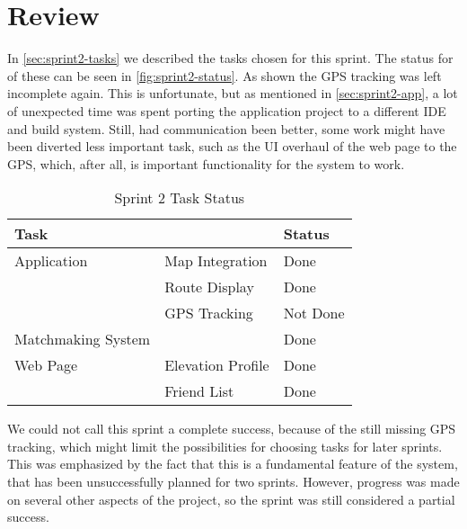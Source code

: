 \section{Review}
\label{sec:sprint2-review}

In \autoref{sec:sprint2-tasks} we described the tasks chosen for this sprint. The status for of these can be seen in \autoref{fig:sprint2-status}. As shown the \ac{GPS} tracking was left incomplete again. This is unfortunate, but as mentioned in \autoref{sec:sprint2-app}, a lot of unexpected time was spent porting the application project to a different \ac{IDE} and build system. Still, had communication been better, some work might have been diverted less important task, such as the \ac{UI} overhaul of the web page to the \ac{GPS}, which, after all, is important functionality for the system to work.

\begin{table}[!ht]
	\centering
	\begin{tabular}{|l l|l|}
		\hline
		\textbf{Task} && \textbf{Status} \\
		\hline
		Application & Map Integration & Done \\
		& Route Display & Done \\
		& \ac{GPS} Tracking & Not Done \\
		\hline
		Matchmaking System && Done \\
		\hline
		Web Page & Elevation Profile & Done \\
		& Friend List & Done \\
		\hline
	\end{tabular}
	\caption{Sprint 2 Task Status}
	\label{fig:sprint2-status}
\end{table}

We could not call this sprint a complete success, because of the still missing \ac{GPS} tracking, which might limit the possibilities for choosing tasks for later sprints. This was emphasized by the fact that this is a fundamental feature of the system, that has been unsuccessfully planned for two sprints. However, progress was made on several other aspects of the project, so the sprint was still considered a partial success.
